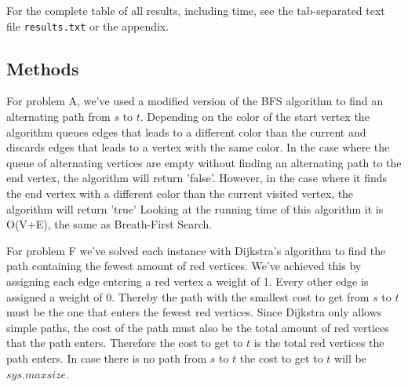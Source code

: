 \documentclass[a4paper]{article}
\begin{document}
For the complete table of all results, including time, see the tab-separated text file {\tt results.txt} or the appendix.

\subsection{Methods}
For problem A, we've used a modified version of the BFS algorithm to find an alternating path from $s$ to $t$. Depending on the color of the start vertex the algorithm queues edges that leads to a different color than the current and discards edges that leads to a vertex with the same color. In the case where the queue of alternating vertices are empty without finding an alternating path to the end vertex, the algorithm will return 'false'. However, in the case where it finds the end vertex with a different color than the current visited vertex, the algorithm will return 'true'
Looking at the running time of this algorithm it is O(V+E), the same as Breath-First Search.

For problem F we've solved each instance with Dijkstra's algorithm to find the path containing the fewest amount of red vertices. We've achieved this by assigning each edge entering a red vertex a weight of 1. Every other edge is assigned a weight of 0. Thereby the path with the smallest cost to get from $s$ to $t$ must be the one that enters the fewest red vertices. Since Dijkstra only allows simple paths, the cost of the path must also be the total amount of red vertices that the path enters. Therefore the cost to get to $t$ is the total red vertices the path enters. In case there is no path from $s$ to $t$ the cost to get to $t$ will be $sys.maxsize$.
\end{document}
